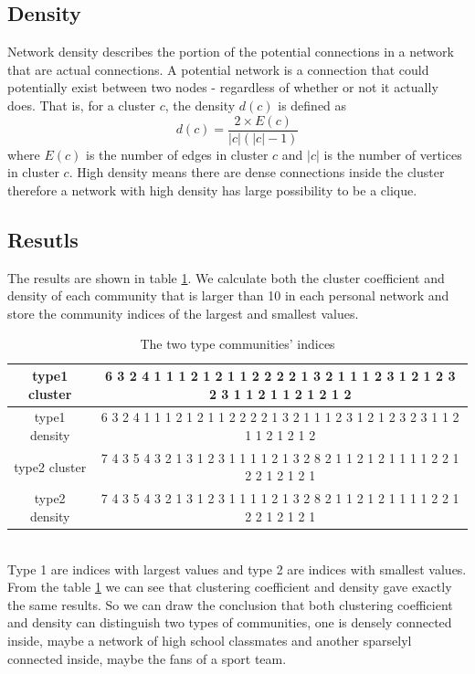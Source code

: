 \documentclass{article}
\begin{document}
\subsection{Density} 
Network density describes the portion of the potential connections in a network that are actual connections. A potential network is a connection that could potentially exist between two nodes - regardless of whether or not it actually does. That is, for a cluster $c$, the density $d(c)$ is defined as\\
\begin{equation*}
d(c) = \frac{2 \times E(c)}{|c|(|c|-1)}
\end{equation*}
where $E(c)$ is the number of edges in cluster $c$ and $|c|$ is the number of vertices in cluster $c$.
High density means there are dense connections inside the cluster therefore a network with high density has large possibility to be a clique.
\subsection{Resutls}
The results are shown in table \ref{tb:type}. We calculate both the cluster coefficient and density of each community that is larger than 10 in each personal network and store the community indices of the largest and smallest values.\\
\begin{table}[hbp]
\caption{The two type communities' indices}
\begin{adjustbox}{center}
\label{tb:type}
\begin{tabular}{|c|c|}
\hline
type1 cluster &6 3 2 4 1 1 1 2 1 2 1 1 2 2 2 2 1 3 2 1 1 1 2 3 1 2 1 2 3 2 3 1 1 2 1 1 2 1 2 1 2\\
\hline
type1 density &6 3 2 4 1 1 1 2 1 2 1 1 2 2 2 2 1 3 2 1 1 1 2 3 1 2 1 2 3 2 3 1 1 2 1 1 2 1 2 1 2\\
\hline
type2 cluster &7 4 3 5 4 3 2 1 3 1 2 3 1 1 1 1 2 1 3 2 8 2 1 1 2 1 2 1 1 1 1 2 2 1 2 2 1 2 1 2 1\\
\hline
type2 density &7 4 3 5 4 3 2 1 3 1 2 3 1 1 1 1 2 1 3 2 8 2 1 1 2 1 2 1 1 1 1 2 2 1 2 2 1 2 1 2 1\\
\hline
\end{tabular}
\end{adjustbox}
\end{table}
\\
Type 1 are indices with largest values and type 2 are indices with smallest values. From the table \ref{tb:type} we can see that clustering coefficient and density gave exactly the same results. So we can draw the conclusion that both clustering coefficient and density can distinguish two types of communities, one is densely connected inside, maybe a network of high school classmates and another sparselyl connected inside, maybe the fans of a sport team.
\end{document}
